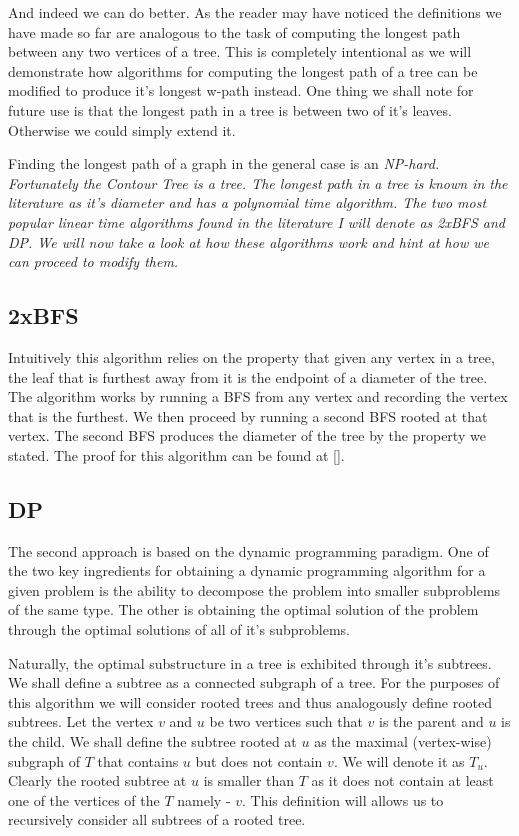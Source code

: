And indeed we can do better. As the reader may have noticed the definitions we have made so far are analogous to the task of computing the longest path between any two vertices of a tree. This is completely intentional as we will demonstrate how algorithms for computing the longest path of a tree can be modified to produce it's longest w-path instead.  One thing we shall note for future use is that the longest path in a tree is between two of it's leaves. Otherwise we could simply extend it.

Finding the longest path of a graph in the general case is an \em NP-hard\em. Fortunately the Contour Tree is a tree. The longest path in a tree is known in the literature as it's diameter and has a polynomial time algorithm. The two most popular linear time algorithms found in the literature I will denote as 2xBFS and DP. We will now take a look at how these algorithms work and hint at how we can proceed to modify them.

\subsection{2xBFS}

Intuitively this algorithm relies on the property that given any vertex in a tree, the leaf that is furthest away from it is the endpoint of a diameter of the tree. The algorithm works by running a BFS from any vertex and recording the vertex that is the furthest. We then proceed by running a second BFS rooted at that vertex. The second BFS produces the diameter of the tree by the property we stated. The proof for this algorithm can be found at [].

\subsection{DP}

The second approach is based on the dynamic programming paradigm. One of the two key ingredients for obtaining a dynamic programming algorithm for a given problem is the ability to decompose the problem into smaller subproblems of the same type. The other is obtaining the optimal solution of the problem through the optimal solutions of all of it's subproblems. 

Naturally, the optimal substructure in a tree is exhibited through it's subtrees. We shall define a subtree as a connected subgraph of a tree. For the purposes of this algorithm we will consider rooted trees and thus analogously define rooted subtrees. Let the vertex $v$ and $u$ be two vertices such that $v$ is the parent and $u$ is the child. We shall define the subtree rooted at $u$ as the maximal (vertex-wise) subgraph of $T$ that contains $u$ but does not contain $v$. We will denote it as $T_u$. Clearly the rooted subtree at $u$ is smaller than $T$ as it does not contain at least one of the vertices of the $T$ namely - $v$. This definition will allows us to recursively consider all subtrees of a rooted tree.

